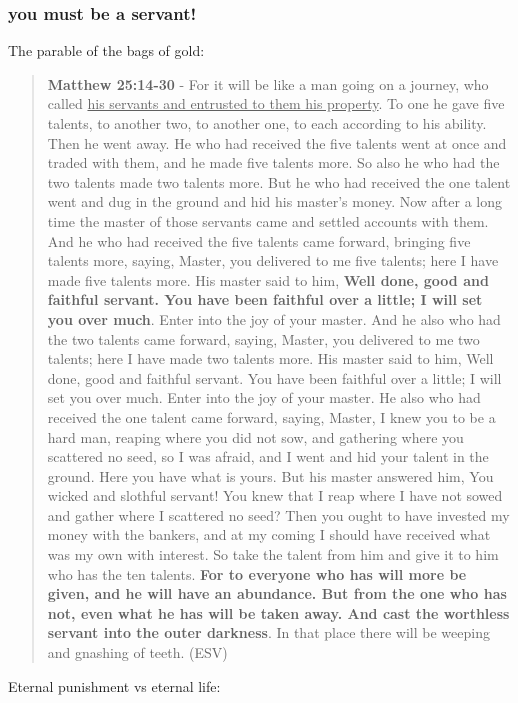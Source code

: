 \documentclass[11pt]{article}
\begin{document}
\subsubsection{you must be a servant!}
\label{sec:orgcb04d6e}
The parable of the bags of gold:

\begin{quote}
\textbf{Matthew 25:14-30} - For it will be like a man going on a journey, who called \uline{his servants and entrusted to them his property}. To one he gave five talents, to another two, to another one, to each according to his ability. Then he went away. He who had received the five talents went at once and traded with them, and he made five talents more. So also he who had the two talents made two talents more. But he who had received the one talent went and dug in the ground and hid his master's money. Now after a long time the master of those servants came and settled accounts with them. And he who had received the five talents came forward, bringing five talents more, saying, Master, you delivered to me five talents; here I have made five talents more. His master said to him, \textbf{Well done, good and faithful servant. You have been faithful over a little; I will set you over much}. Enter into the joy of your master. And he also who had the two talents came forward, saying, Master, you delivered to me two talents; here I have made two talents more. His master said to him, Well done, good and faithful servant. You have been faithful over a little; I will set you over much. Enter into the joy of your master. He also who had received the one talent came forward, saying, Master, I knew you to be a hard man, reaping where you did not sow, and gathering where you scattered no seed, so I was afraid, and I went and hid your talent in the ground. Here you have what is yours. But his master answered him, You wicked and slothful servant! You knew that I reap where I have not sowed and gather where I scattered no seed? Then you ought to have invested my money with the bankers, and at my coming I should have received what was my own with interest. So take the talent from him and give it to him who has the ten talents. \textbf{For to everyone who has will more be given, and he will have an abundance. But from the one who has not, even what he has will be taken away. And cast the worthless servant into the outer darkness}. In that place there will be weeping and gnashing of teeth. (ESV)
\end{quote}

Eternal punishment vs eternal life:
\end{document}
